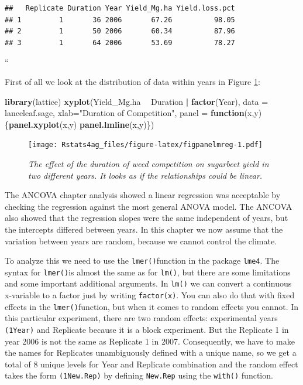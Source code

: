 \documentclass[letterpaper,]{book}
\newenvironment{Shaded}{\begin{snugshade}}{\end{snugshade}}
\newcommand{\ControlFlowTok}[1]{\textcolor[rgb]{0.13,0.29,0.53}{\textbf{#1}}}
\newcommand{\DataTypeTok}[1]{\textcolor[rgb]{0.13,0.29,0.53}{#1}}
\newcommand{\KeywordTok}[1]{\textcolor[rgb]{0.13,0.29,0.53}{\textbf{#1}}}
\newcommand{\NormalTok}[1]{#1}
\newcommand{\OperatorTok}[1]{\textcolor[rgb]{0.81,0.36,0.00}{\textbf{#1}}}
\newcommand{\StringTok}[1]{\textcolor[rgb]{0.31,0.60,0.02}{#1}}
\begin{document}
\begin{verbatim}
##   Replicate Duration Year Yield_Mg.ha Yield.loss.pct
## 1         1       36 2006       67.26          98.05
## 2         1       50 2006       60.34          87.96
## 3         1       64 2006       53.69          78.27
\end{verbatim}

``

First of all we look at the distribution of data within years in Figure \ref{fig:figpanelmreg}:



\begin{Shaded}
\begin{Highlighting}[]
\KeywordTok{library}\NormalTok{(lattice)}
\KeywordTok{xyplot}\NormalTok{(Yield_Mg.ha }\OperatorTok{~}\StringTok{ }\NormalTok{Duration }\OperatorTok{|}\StringTok{ }\KeywordTok{factor}\NormalTok{(Year), }\DataTypeTok{data =}\NormalTok{ lanceleaf.sage,}
    \DataTypeTok{xlab=}\StringTok{"Duration of Competition"}\NormalTok{,}
       \DataTypeTok{panel =} \ControlFlowTok{function}\NormalTok{(x,y)}
\NormalTok{         \{}\KeywordTok{panel.xyplot}\NormalTok{(x,y)}
          \KeywordTok{panel.lmline}\NormalTok{(x,y)\})}
\end{Highlighting}
\end{Shaded}

\begin{figure}
\centering
\texttt{[image: Rstats4ag\_files/figure-latex/figpanelmreg-1.pdf]}
\caption{\label{fig:figpanelmreg}\emph{The effect of the duration of weed competition on sugarbeet yield in two different years. It looks as if the relationships could be linear.}}
\end{figure}

The ANCOVA chapter analysis showed a linear regression was acceptable by checking the regression against the most general ANOVA model. The ANCOVA also showed that the regression slopes were the same independent of years, but the intercepts differed between years. In this chapter we now assume that the variation between years are random, because we cannot control the climate.

To analyze this we need to use the \texttt{lmer()}function in the package \texttt{lme4}. The syntax for \texttt{lmer()}is almost the same as for \texttt{lm()}, but there are some limitations and some important additional arguments. In \texttt{lm()} we can convert a continuous x-variable to a factor just by writing \texttt{factor(x)}. You can also do that with fixed effects in the \texttt{lmer()}function, but when it comes to random effects you cannot. In this particular experiment, there are two random effects: experimental years \texttt{(1\textbar{}Year)} and Replicate because it is a block experiment. But the Replicate 1 in year 2006 is not the same as Replicate 1 in 2007. Consequently, we have to make the names for Replicates unambiguously defined with a unique name, so we get a total of 8 unique levels for Year and Replicate combination and the random effect takes the form \texttt{(1\textbar{}New.Rep)} by defining \texttt{New.Rep} using the \texttt{with()} function.
\end{document}
